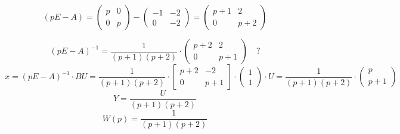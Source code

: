 \[
  (pE - A) = \begin{pmatrix} p & 0 \\ 0 & p \end{pmatrix} -
  \begin{pmatrix} -1 & -2 \\ 0 & -2 \end{pmatrix} =
  \begin{pmatrix} p+1 & 2 \\ 0 & p+2 \end{pmatrix} 
\] 

\[
  (pE - A)^{-1} = \frac{1}{(p+1)(p+2)} \cdot \begin{pmatrix} 
    p+2 & 2 \\ 0 & p+1
  \end{pmatrix} \quad \text{?}
\] 
\[
  x = (pE - A)^{-1} \cdot BU = \frac{1}{(p+1)(p+2)} \cdot 
  \begin{bmatrix} p+2 & -2 \\ 0 & p+1 \end{bmatrix} \cdot 
  \begin{pmatrix} 1\\1 \end{pmatrix} \cdot U = \frac{1}{(p+1)(p+2)} \cdot
  \begin{pmatrix} p \\ p+1 \end{pmatrix} 
\] 
\[
  Y = \frac{U}{(p+1)(p+2)}
\] 
\[
  W(p) = \frac{1}{(p+1)(p+2)}
\] 
